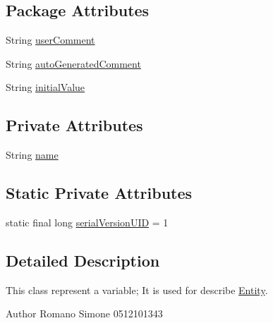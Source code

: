 \subsection*{Package Attributes}
\begin{DoxyCompactItemize}
\item 
String \hyperlink{classit_1_1isislab_1_1masonhelperdocumentation_1_1_o_d_d_1_1_variable_abc4f019f82f47614b2b62743799dc7b5}{user\-Comment}
\item 
String \hyperlink{classit_1_1isislab_1_1masonhelperdocumentation_1_1_o_d_d_1_1_variable_a66bdb6cd067ee33adcd4556f5b672f23}{auto\-Generated\-Comment}
\item 
String \hyperlink{classit_1_1isislab_1_1masonhelperdocumentation_1_1_o_d_d_1_1_variable_abf11129fa15afb4375d1e040728de05d}{initial\-Value}
\end{DoxyCompactItemize}
\subsection*{Private Attributes}
\begin{DoxyCompactItemize}
\item 
String \hyperlink{classit_1_1isislab_1_1masonhelperdocumentation_1_1_o_d_d_1_1_variable_acf7d0255e957f01bd74e72a81209d3ad}{name}
\end{DoxyCompactItemize}
\subsection*{Static Private Attributes}
\begin{DoxyCompactItemize}
\item 
static final long \hyperlink{classit_1_1isislab_1_1masonhelperdocumentation_1_1_o_d_d_1_1_variable_a56e60bd2a6d65b85d1a67bc61a3c204c}{serial\-Version\-U\-I\-D} = 1
\end{DoxyCompactItemize}


\subsection{Detailed Description}
This class represent a variable; It is used for describe \hyperlink{classit_1_1isislab_1_1masonhelperdocumentation_1_1_o_d_d_1_1_entity}{Entity}. \begin{DoxyAuthor}{Author}
Romano Simone 0512101343 
\end{DoxyAuthor}



